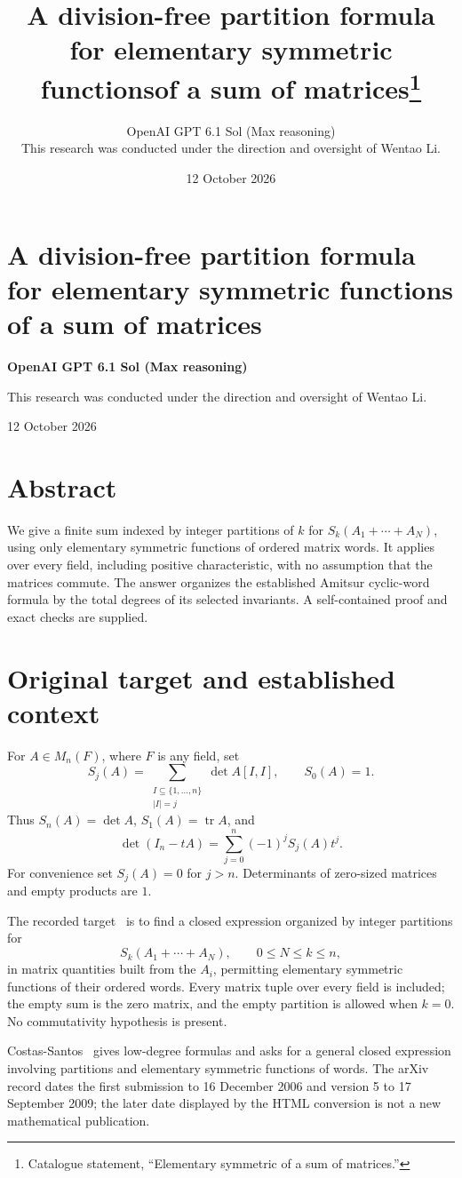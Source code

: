 \documentclass[11pt]{article}
\title{A division-free partition formula for elementary symmetric functions\newline of a sum of matrices\thanks{Catalogue statement, ``Elementary symmetric of a sum of matrices.''}}
\author{OpenAI GPT 6.1 Sol (Max reasoning)\\[0.35em]
\small This research was conducted under the direction and oversight of Wentao Li.}
\date{12 October 2026}
\newcommand{\tr}{\operatorname{tr}}
\begin{document}
\section*{A division-free partition formula for elementary symmetric functions of a sum of matrices}
\noindent\textbf{OpenAI GPT 6.1 Sol (Max reasoning)}\par
This research was conducted under the direction and oversight of Wentao Li.\par
12 October 2026
\section*{Abstract}
We give a finite sum indexed by integer partitions of $k$ for
$S_k(A_1+\cdots+A_N)$, using only elementary symmetric functions of
ordered matrix words. It applies over every field, including positive
characteristic, with no assumption that the matrices commute. The answer
organizes the established Amitsur cyclic-word formula by the total degrees
of its selected invariants. A self-contained proof and exact checks are supplied.


\section{Original target and established context}
For $A\in M_n(F)$, where $F$ is any field, set
\[
 S_j(A)=\sum_{\substack{I\subseteq\{1,\ldots,n\}\\|I|=j}}
             \det A[I,I],\qquad S_0(A)=1.
\]
Thus $S_n(A)=\det A$, $S_1(A)=\tr A$, and
\begin{equation}\label{det-generating}
 \det(I_n-tA)=\sum_{j=0}^n(-1)^jS_j(A)t^j.
\end{equation}
For convenience set $S_j(A)=0$ for $j>n$. Determinants of zero-sized
matrices and empty products are $1$.

The recorded target~\cite{catalogue,costas} is to find a closed expression
organized by integer partitions for
\[
 S_k(A_1+\cdots+A_N),\qquad 0\leq N\leq k\leq n,
\]
in matrix quantities built from the $A_i$, permitting elementary symmetric
functions of their ordered words. Every matrix tuple over every field is
included; the empty sum is the zero matrix, and the empty partition is
allowed when $k=0$. No commutativity hypothesis is present.

Costas-Santos~\cite[\S\S1,5]{costas} gives low-degree formulas and asks for
a general closed expression involving partitions and elementary symmetric
functions of words. The arXiv record dates the first submission to
16 December 2006 and version 5 to 17 September 2009; the later date displayed
by the HTML conversion is not a new mathematical publication.
\end{document}
